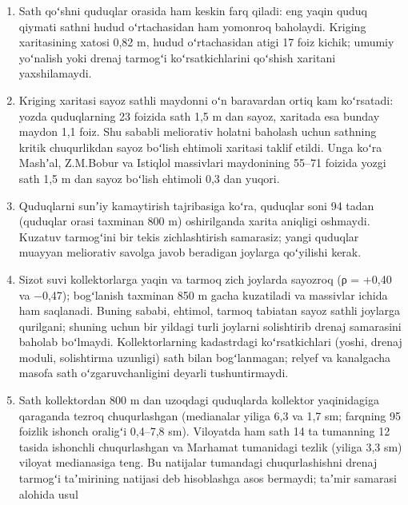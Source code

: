 \begin{enumerate}
  Yogʻinning asosiy qismi noyabr--aprelda boʻlsa-da, sath yozda
  koʻtariladi: demak, uni asosan sugʻorish va kanallardan sizib chiqqan
  suv belgilaydi. Yillik oʻrtacha sath ayrim massivlardagi yozgi xavfli
  holatni yashiradi, shuning uchun drenaj tizimini baholashda yozgi eng
  sayoz holat asosiy mezon boʻlishi kerak.
\item
  Sath qoʻshni quduqlar orasida ham keskin farq qiladi: eng yaqin quduq
  qiymati sathni hudud oʻrtachasidan ham yomonroq baholaydi. Kriging
  xaritasining xatosi 0,82 m, hudud oʻrtachasidan atigi 17 foiz kichik;
  umumiy yoʻnalish yoki drenaj tarmogʻi koʻrsatkichlarini qoʻshish
  xaritani yaxshilamaydi.
\item
  Kriging xaritasi sayoz sathli maydonni oʻn baravardan ortiq kam
  koʻrsatadi: yozda quduqlarning 23 foizida sath 1,5 m dan sayoz,
  xaritada esa bunday maydon 1,1 foiz. Shu sababli meliorativ holatni
  baholash uchun sathning kritik chuqurlikdan sayoz boʻlish ehtimoli
  xaritasi taklif etildi. Unga koʻra Mashʼal, Z.M.Bobur va Istiqlol
  massivlari maydonining 55--71 foizida yozgi sath 1,5 m dan sayoz
  boʻlish ehtimoli 0,3 dan yuqori.
\item
  Quduqlarni sunʼiy kamaytirish tajribasiga koʻra, quduqlar soni 94
  tadan (quduqlar orasi taxminan 800 m) oshirilganda xarita aniqligi
  oshmaydi. Kuzatuv tarmogʻini bir tekis zichlashtirish samarasiz; yangi
  quduqlar muayyan meliorativ savolga javob beradigan joylarga
  qoʻyilishi kerak.
\item
  Sizot suvi kollektorlarga yaqin va tarmoq zich joylarda sayozroq (ρ =
  +0,40 va −0,47); bogʻlanish taxminan 850 m gacha kuzatiladi va
  massivlar ichida ham saqlanadi. Buning sababi, ehtimol, tarmoq
  tabiatan sayoz sathli joylarga qurilgani; shuning uchun bir yildagi
  turli joylarni solishtirib drenaj samarasini baholab boʻlmaydi.
  Kollektorlarning kadastrdagi koʻrsatkichlari (yoshi, drenaj moduli,
  solishtirma uzunligi) sath bilan bogʻlanmagan; relyef va kanalgacha
  masofa sath oʻzgaruvchanligini deyarli tushuntirmaydi.
\item
  Sath kollektordan 800 m dan uzoqdagi quduqlarda kollektor yaqinidagiga
  qaraganda tezroq chuqurlashgan (medianalar yiliga 6,3 va 1,7 sm;
  farqning 95 foizlik ishonch oraligʻi 0,4--7,8 sm). Viloyatda ham sath
  14 ta tumanning 12 tasida ishonchli chuqurlashgan va Marhamat
  tumanidagi tezlik (yiliga 3,3 sm) viloyat medianasiga teng. Bu
  natijalar tumandagi chuqurlashishni drenaj tarmogʻi taʼmirining
  natijasi deb hisoblashga asos bermaydi; taʼmir samarasi alohida usul

\end{enumerate}
